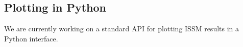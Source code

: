 
\subsection{Plotting in Python} \label{sec:getting-started-plotting-python}
We are currently working on a standard API for plotting ISSM results in a Python interface.

\clearpage %
